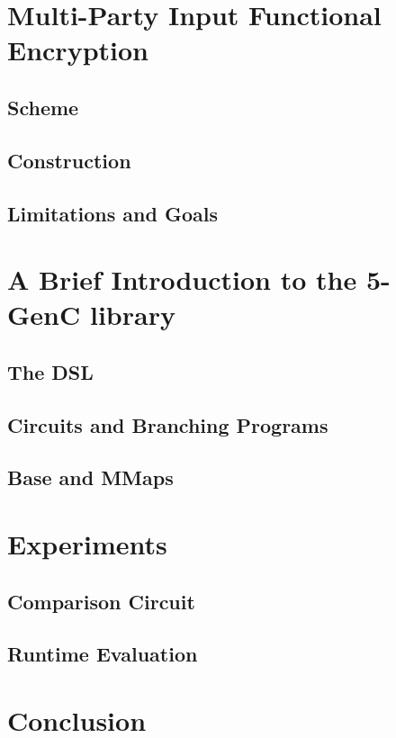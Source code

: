 \documentclass[12pt,twoside]{reedthesis}
\begin{document}
    
    \chapter{Multi-Party Input Functional Encryption}
    \section{Scheme}
    \section{Construction}
    \section{Limitations and Goals}
    
    
    
    \chapter{ A Brief Introduction to the 5-GenC library}
    \section{ The DSL}
    \section{Circuits and Branching Programs}
    \section{Base and MMaps}
    
    \chapter{Experiments}
    \section{Comparison Circuit}
    \section{Runtime Evaluation}
    
    
    \chapter{Conclusion} 
    
    
    
    

 

\end{document}
